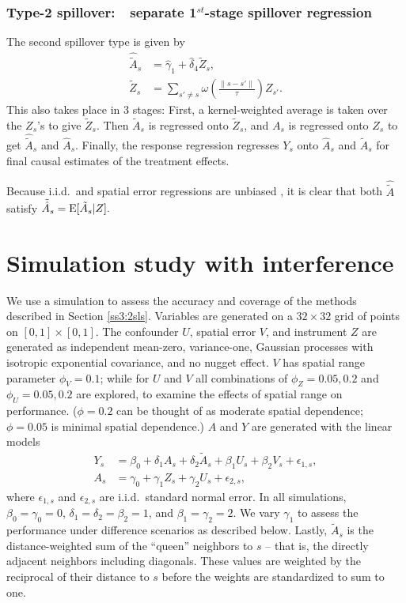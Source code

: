 \documentclass[12pt]{article}
\begin{document}
\subsubsection{Type-2 spillover:~~separate 1$^{st}$-stage spillover regression} \label{type2spillover}
The second spillover type is given by
\begin{align*}
        \hat{\tilde{A}}_s &= \hat{\gamma}_1 + \hat{\delta}_4 \tilde{Z}_s, \\
    \tilde{Z}_s &= \sum_{s' \ne s } \omega\left(\frac{\|s-s'\|}{\tau}\right) Z_{s'}.
\end{align*}
This also takes place in 3 stages: First, a kernel-weighted average is taken over the $Z_s$'s to give $\tilde{Z}_s$. Then $\tilde{A}_s$ is regressed onto $\tilde{Z}_s$, and $A_s$ is regressed onto $Z_s$ to get $\hat{\tilde{A}}_s$ and $\hat{A}_s$.  Finally, the response regression regresses $Y_s$ onto $\hat{A}_s$ and $\hat{\tilde{A}}_s$ for final causal estimates of the treatment effects.

Because i.i.d.~and spatial error regressions are unbiased \citep{basu1994regression}, it is clear that both $\hat{\tilde{A}}$ satisfy
$\tilde{\hat{A}}_s = \operatorname{E} [ \tilde{A}_{s} | Z ].$



\section{Simulation study with interference}\label{s3:simInterference}

We use a simulation to assess the accuracy and coverage of the methods described in Section \ref{ss3:2sls}. Variables are generated on a $32\times 32$ grid of points on $[0,1] \times [0,1]$. The confounder $U$, spatial error $V$, and instrument $Z$ are generated as independent mean-zero, variance-one, Gaussian processes with  isotropic exponential covariance, and no nugget effect. $V$ has spatial range parameter $\phi_V = 0.1$; while for $U$ and $V$ all combinations of $\phi_Z = 0.05,0.2$ and $\phi_U = 0.05,0.2$ are explored, to examine the effects of spatial range on performance. ($\phi = 0.2$ can be thought of as moderate spatial dependence; $\phi = 0.05$ is minimal spatial dependence.) $A$ and $Y$ are generated with the linear models 
\begin{align}
Y_s &= \beta_0 + \delta_1 A_s + \delta_2 \tilde{A}_s + \beta_1 U_s + \beta_2 V_s + \epsilon_{1,s},\\
A_s &= \gamma_0 + \gamma_1 Z_s + \gamma_2 U_s + \epsilon_{2,s},
\end{align}
where $\epsilon_{1,s}$ and $\epsilon_{2,s}$ are i.i.d.~standard normal error. In all simulations, $\beta_0 = \gamma_0 = 0$,  $\delta_1 = \delta_2 =  \beta_2 = 1$, and $\beta_1 = \gamma_2 = 2$.  We vary $\gamma_1$ to assess the performance under difference scenarios as described below. Lastly, $\tilde{A}_s$ is the distance-weighted sum of the ``queen'' neighbors to $s$ -- that is, the directly adjacent neighbors including diagonals. These values are weighted by the reciprocal of their distance to $s$ before the weights are standardized to sum to one.
\end{document}
